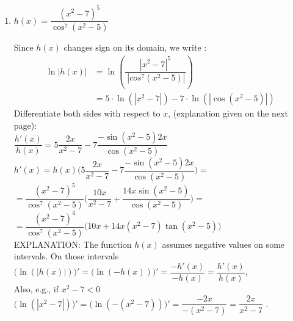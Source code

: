 \documentclass{ximera}
\begin{document}
\begin{problem}
\begin{enumerate}
\begin{explanation}
              $\dfrac{f'(x)}{f(x)} =\dfrac{5}{x+1}+\dfrac{4\cos(x)}{\sin(x)+5}-\dfrac{2x}{x^2+5}-\dfrac{1}{2(x-3)}$
              
              Then we solve for $f'(x)$.
              
              
                $f'(x) =f(x)\Bigl(\dfrac{5}{x+1}+\dfrac{4\cos(x)}{\sin(x)+5}-\dfrac{2x}{x^2+5}-\dfrac{1}{2(x-3)}\Bigr)$
                Then we substitute.\\
                
                   $f'(x) = \dfrac{(x+1)^5(\sin(x)+5)^4}{(x^2 + 5)\sqrt{x-3}}\Bigl(\dfrac{5}{x+1}+\dfrac{4\cos(x)}{\sin(x)+5}-\dfrac{2x}{x^2+5}-\dfrac{1}{2(x-3)}\Bigr)$
                
          \end{explanation}
	\item  $h(x) = \dfrac{(x^2 - 7)^5}{\cos^7(x^2 - 5)}$
\begin{explanation}
            Since $h(x)$ changes sign on its domain, we write :
            \begin{align*}
              \ln |h(x)| &= \ln \left( \dfrac{|x^2 - 7|^5}{\ |cos^7(x^2 - 5)|}\right) \\
                       &= 5 \cdot \ln (|x^2 - 7|) - 7 \cdot \ln(|\cos(x^2-5)|)
            \end{align*}
  Differentiate both sides with respect to $x$, (explanation given on the next page):\\[1em]
             $ \dfrac{h'(x)}{h(x)} = 5 \dfrac{2x}{x^2 - 7}  - 7 \dfrac{-\sin(x^2-5)2x}{\cos(x^2 - 5)} $\\[1em]
 $ h'(x) =h(x)\bigl( 5 \dfrac{2x}{x^2 - 7}  - 7 \dfrac{-\sin(x^2-5)2x}{\cos(x^2 - 5)} \bigr)=$\\[1em]
 $  =\dfrac{(x^2 - 7)^5}{\cos^7(x^2 - 5)}\bigl(  \dfrac{10x}{x^2 - 7}  + \dfrac{14x\sin(x^2-5)}{\cos(x^2 - 5)} \bigr)=$\\[1em]
 $  =\dfrac{(x^2 - 7)^4}{\cos^7(x^2 - 5)}\bigl(  10x  + 14x(x^2-7) \tan(x^2-5) \bigr)$\\[1em]

EXPLANATION: The function $h(x)$ assumes negative values on some intervals. On those intervals\\[1em]

 $\bigl(\ln(|h(x)|)\bigr)'=\bigl(\ln(-h(x))\bigr)'=\dfrac{-h'(x)}{-h(x)}=\dfrac{h'(x)}{h(x)}$, \\[2em]
 Also,  e.g., if   \hspace{0.2in} $x^2-7<0$\\[1em]

$\bigl(\ln(|x^2-7|)\bigr)'=\bigl(\ln(-(x^2-7))\bigr)'=\dfrac{-2x}{-(x^2-7)}=\dfrac{2x}{x^2-7}$ .
\end{explanation}
	\end{enumerate}
\end{problem}
\end{document}
